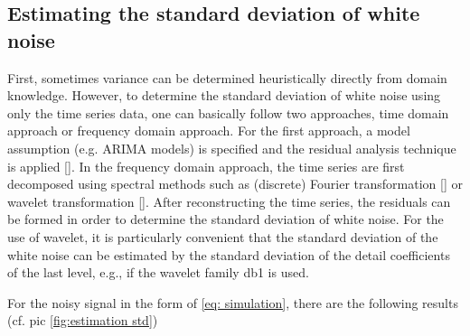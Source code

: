 \documentclass[oneside]{article}
\theoremstyle{plain}%
\theoremstyle{definition}
\begin{document}
\subsection{Estimating the standard deviation of white noise}

First, sometimes variance can be determined heuristically directly from domain knowledge. 
However, to determine the standard deviation of white noise using only the time series data, one can basically follow two approaches, time domain approach or frequency domain approach. For the first approach, a model assumption (e.g. ARIMA models) is specified and the residual analysis technique is applied [\cite{chitturi1974distribution}]. 
In the frequency domain approach, the time series are first decomposed using spectral methods such as (discrete) Fourier transformation [\cite{sauer1992noise}] or wavelet transformation [\cite{heil1989continuous,donoho1994ideal,jansen2012noise}]. After reconstructing the time series, the residuals can be formed in order to determine the standard deviation of white noise. For the use of wavelet, it is particularly convenient that the standard deviation of the white noise can be estimated by the standard deviation of the detail coefficients of the last level, e.g., if the wavelet family db1 is used.

For the noisy signal in the form of \ref{eq: simulation},  there are the following results (cf. pic \ref{fig:estimation std})

\end{document}
